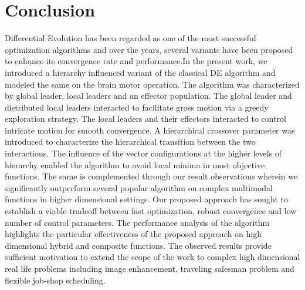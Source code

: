 \section{Conclusion}

Differential Evolution has been regarded as one of the most successful optimization algorithms
and over the years, several variants have been proposed to enhance its convergence rate and performance.In the present work, we introduced a hierarchy influenced variant of the classical DE algorithm and modeled the same on the brain motor operation. The algorithm was characterized by global leader, local leaders and an effector population. The global leader and distributed local leaders interacted to facilitate gross motion via a greedy exploration strategy. The local leaders and their effectors interacted to control intricate motion for smooth convergence. A hierarchical crossover parameter was introduced to characterize the hierarchical transition between the two interactions. The influence of the vector configurations at the higher levels of hierarchy enabled the algorithm to avoid local minima in most objective functions. The same is complemented through our result observations wherein we significantly outperform several popular algorithm on complex multimodal functions in higher dimensional settings.
Our proposed approach has sought to establish a viable tradeoff between fast optimization, robust convergence and low number of control parameters.
The performance analysis of the algorithm highlights the particular effectiveness of the proposed approach on high dimensional hybrid and composite functions. The observed results provide sufficient motivation to extend the scope of the work to complex high dimensional real life problems including image enhancement, traveling salesman problem and flexible job-shop scheduling.





